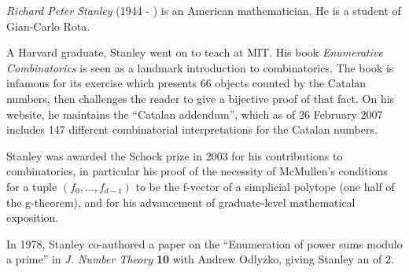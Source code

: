 \documentclass[12pt]{article}
\begin{document}
\emph{Richard Peter Stanley} (1944 - ) is an American mathematician.
He is a student of Gian-Carlo Rota.

A Harvard graduate, Stanley went on to teach at MIT. His book {\it
Enumerative Combinatorics} is seen as a landmark introduction to
combinatorics.  The book is infamous for its exercise which presents
66 objects counted by the Catalan numbers, then challenges the reader
to give a bijective proof of that fact.  On his website, he maintains
the ``Catalan addendum'', which as of 26 February 2007 includes 147
different combinatorial interpretations for the Catalan numbers.

Stanley was awarded the Schock prize in 2003 for his contributions to
combinatorics, in particular his proof of the necessity of McMullen's
conditions for a tuple $(f_0,\dots,f_{d-1})$ to be the f-vector of a
simplicial polytope (one half of the g-theorem), and for his advancement
of graduate-level mathematical exposition.

In 1978, Stanley co-authored a paper on the ``Enumeration of power
sums modulo a prime'' in {\it J. Number Theory} {\bf 10} with Andrew
Odlyzko, giving Stanley an 
of 2.

\end{document}
